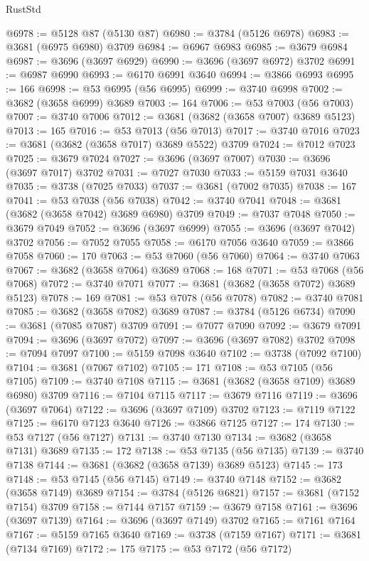 \begin{lexlean}{RustStd}
\begin{coremodule}
@6978 := @5128 @87 (@5130 @87)
@6980 := @3784 (@5126 @6978)
@6983 := @3681 (@6975 @6980) @3709
@6984 := @6967 @6983
@6985 := @3679 @6984
@6987 := @3696 (@3697 @6929)
@6990 := @3696 (@3697 @6972) @3702
@6991 := @6987 @6990
@6993 := @6170 @6991 @3640
@6994 := @3866 @6993
@6995 := 166
@6998 := @53 @6995 (@56 @6995)
@6999 := @3740 @6998
@7002 := @3682 (@3658 @6999) @3689
@7003 := 164
@7006 := @53 @7003 (@56 @7003)
@7007 := @3740 @7006
@7012 := @3681 (@3682 (@3658 @7007) @3689 @5123)
@7013 := 165
@7016 := @53 @7013 (@56 @7013)
@7017 := @3740 @7016
@7023 := @3681 (@3682 (@3658 @7017) @3689 @5522) @3709
@7024 := @7012 @7023
@7025 := @3679 @7024
@7027 := @3696 (@3697 @7007)
@7030 := @3696 (@3697 @7017) @3702
@7031 := @7027 @7030
@7033 := @5159 @7031 @3640
@7035 := @3738 (@7025 @7033)
@7037 := @3681 (@7002 @7035)
@7038 := 167
@7041 := @53 @7038 (@56 @7038)
@7042 := @3740 @7041
@7048 := @3681 (@3682 (@3658 @7042) @3689 @6980) @3709
@7049 := @7037 @7048
@7050 := @3679 @7049
@7052 := @3696 (@3697 @6999)
@7055 := @3696 (@3697 @7042) @3702
@7056 := @7052 @7055
@7058 := @6170 @7056 @3640
@7059 := @3866 @7058
@7060 := 170
@7063 := @53 @7060 (@56 @7060)
@7064 := @3740 @7063
@7067 := @3682 (@3658 @7064) @3689
@7068 := 168
@7071 := @53 @7068 (@56 @7068)
@7072 := @3740 @7071
@7077 := @3681 (@3682 (@3658 @7072) @3689 @5123)
@7078 := 169
@7081 := @53 @7078 (@56 @7078)
@7082 := @3740 @7081
@7085 := @3682 (@3658 @7082) @3689
@7087 := @3784 (@5126 @6734)
@7090 := @3681 (@7085 @7087) @3709
@7091 := @7077 @7090
@7092 := @3679 @7091
@7094 := @3696 (@3697 @7072)
@7097 := @3696 (@3697 @7082) @3702
@7098 := @7094 @7097
@7100 := @5159 @7098 @3640
@7102 := @3738 (@7092 @7100)
@7104 := @3681 (@7067 @7102)
@7105 := 171
@7108 := @53 @7105 (@56 @7105)
@7109 := @3740 @7108
@7115 := @3681 (@3682 (@3658 @7109) @3689 @6980) @3709
@7116 := @7104 @7115
@7117 := @3679 @7116
@7119 := @3696 (@3697 @7064)
@7122 := @3696 (@3697 @7109) @3702
@7123 := @7119 @7122
@7125 := @6170 @7123 @3640
@7126 := @3866 @7125
@7127 := 174
@7130 := @53 @7127 (@56 @7127)
@7131 := @3740 @7130
@7134 := @3682 (@3658 @7131) @3689
@7135 := 172
@7138 := @53 @7135 (@56 @7135)
@7139 := @3740 @7138
@7144 := @3681 (@3682 (@3658 @7139) @3689 @5123)
@7145 := 173
@7148 := @53 @7145 (@56 @7145)
@7149 := @3740 @7148
@7152 := @3682 (@3658 @7149) @3689
@7154 := @3784 (@5126 @6821)
@7157 := @3681 (@7152 @7154) @3709
@7158 := @7144 @7157
@7159 := @3679 @7158
@7161 := @3696 (@3697 @7139)
@7164 := @3696 (@3697 @7149) @3702
@7165 := @7161 @7164
@7167 := @5159 @7165 @3640
@7169 := @3738 (@7159 @7167)
@7171 := @3681 (@7134 @7169)
@7172 := 175
@7175 := @53 @7172 (@56 @7172)

\end{coremodule}
\end{lexlean}
